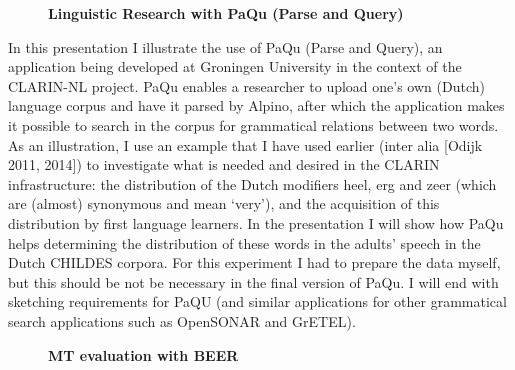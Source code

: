 \documentclass[10pt, a4paper, twopage, headinclude, footinclude, BCOR5mm]{book}
\begin{document}
\newpage

\begin{figure}[t!]
\centering
\large\textbf{Linguistic Research with PaQu (Parse and Query) }
\vspace*{0.5cm}
\end{figure}


\begin{table}[t!]
\end{table} 
\noindent
In this presentation I illustrate the use of PaQu (Parse and Query), an application being developed at Groningen University in the context of the CLARIN-NL project. PaQu enables a researcher to upload one’s own (Dutch) language corpus and have it parsed by Alpino, after which the application makes it possible to search in the corpus for grammatical relations between two words. As an illustration, I use an example that I have used earlier (inter alia [Odijk 2011, 2014]) to investigate what is needed and desired in the CLARIN infrastructure: the distribution of the Dutch modifiers heel, erg and zeer (which are (almost) synonymous and mean `very’), and the acquisition of this distribution by first language learners. In the presentation I will show how PaQu helps determining the distribution of these words in the adults’ speech in the Dutch CHILDES corpora.  For this experiment I had to prepare the data myself, but this should be not be necessary in the final version of PaQu. I will end with sketching requirements for PaQU (and similar applications for other grammatical search applications such as OpenSONAR and GrETEL).   

\newpage

\begin{figure}[t!]
\centering
\large\textbf{MT evaluation with BEER}
\vspace*{0.5cm}
\end{figure}
\end{document}
